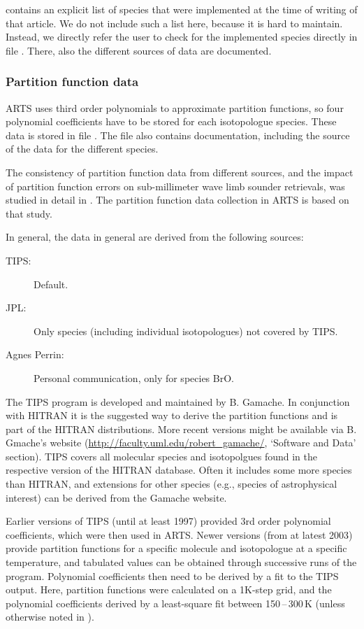 \citet{buehler:artst:05} contains an explicit list of species that
were implemented at the time of writing of that article.  We do not include
such a list here, because it is hard to maintain. Instead, we directly refer
the user to check for the implemented species directly in file
. There, also the different sources of data
are documented.

\subsubsection{Partition function data}

ARTS uses third order polynomials to approximate partition functions,
so four polynomial coefficients have to be stored for each isotopologue
species. These data is stored in file
. The file also contains
documentation, including the source of the data for the different species.

The consistency of partition function data from different sources, and
the impact of partition function errors on sub-millimeter wave limb
sounder retrievals, was studied in detail in \citet{cverdes:05}. The
partition function data collection in ARTS is based on that study.

In general, the data in general are derived from the following sources:
\begin{description}
\item[TIPS:] Default.
\item[JPL:] Only species (including individual isotopologues) not covered by TIPS.
\item[Agnes Perrin:] Personal communication, only for species BrO.
\end{description}

The TIPS program is developed and maintained by B. Gamache. In conjunction
with HITRAN it is the suggested way to derive the partition functions and is part of the HITRAN distributions. More recent versions might be available via B. Gmache's website (\url{http://faculty.uml.edu/robert_gamache/}, `Software and Data' section). TIPS covers all molecular species and isotopolgues found in the respective version of the HITRAN database. Often it includes some more species than HITRAN, and extensions for other species (e.g., species of astrophysical interest) can be derived from the Gamache website.

Earlier versions of TIPS (until at least 1997) provided 3rd order polynomial
coefficients, which were then used in ARTS.
Newer versions (from at latest 2003) provide partition
functions for a specific molecule and isotopologue at a specific temperature,
and tabulated values can be obtained through successive runs of the program.
Polynomial coefficients then need to be derived by a fit to the TIPS output.
Here, partition functions were calculated on a 1K-step grid, and the polynomial
coefficients derived by a least-square fit between 150\,--\,300\,K (unless
otherwise noted in ).

